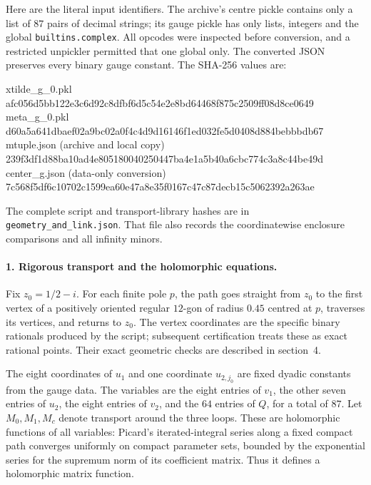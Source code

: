 Here are the literal input identifiers.  The archive's centre
pickle contains only a list of $87$ pairs of decimal strings;
its gauge pickle has only lists, integers and the global
\texttt{builtins.complex}.  All opcodes were inspected before
conversion, and a restricted unpickler permitted that one
global only.  The converted JSON preserves every binary gauge
constant.  The SHA-256 values are:
\begin{center}\begin{minipage}{0.96\linewidth}\scriptsize\ttfamily
xtilde\_g\_0.pkl\\
afc056d5bb122e3c6d92c8dfbf6d5c54e2e8bd64468f875c2509ff08d8ce0649\\
meta\_g\_0.pkl\\
d60a5a641dbaef02a9bc02a0f4c4d9d16146f1ed032fe5d0408d884bebbbdb67\\
mtuple.json (archive and local copy)\\
239f3df1d88ba10ad4e805180040250447ba4e1a5b40a6cbc774c3a8c44be49d\\
center\_g.json (data-only conversion)\\
7c568f5df6c10702c1599ea60e47a8e35f0167c47c87decb15c5062392a263ae
\end{minipage}\end{center}
The complete script and transport-library hashes are in
\texttt{geometry\_and\_link.json}.  That file also records the
coordinatewise enclosure comparisons and all infinity minors.

\paragraph{1. Rigorous transport and the holomorphic equations.}
Fix $z_0=1/2-i$.  For each finite pole $p$, the path goes straight
from $z_0$ to the first vertex of a positively oriented regular
$12$-gon of radius $0.45$ centred at $p$, traverses its vertices,
and returns to $z_0$.  The vertex coordinates are the specific
binary rationals produced by the script; subsequent certification
treats these as exact rational points.  Their exact geometric
checks are described in section~4.

The eight coordinates of $u_1$ and one coordinate $u_{2,j_0}$
are fixed dyadic constants from the gauge data.  The variables are
the eight entries of $v_1$, the other seven entries of $u_2$,
the eight entries of $v_2$, and the $64$ entries of $Q$, for a
total of $87$.  Let $M_0,M_1,M_c$ denote transport around the
three loops.  These are holomorphic functions of all variables:
Picard's iterated-integral series along a fixed compact path
converges uniformly on compact parameter sets, bounded by the
exponential series for the supremum norm of its coefficient
matrix.  Thus it defines a holomorphic matrix function.

